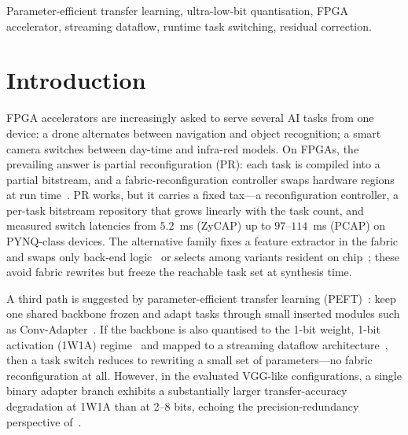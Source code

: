 \documentclass[journal]{IEEEtran}
\begin{document}
\begin{IEEEkeywords}
Parameter-efficient transfer learning, ultra-low-bit quantisation, FPGA accelerator, streaming dataflow, runtime task switching, residual correction.
\end{IEEEkeywords}

\section{Introduction}
 FPGA accelerators are increasingly asked to serve several AI tasks from one device: a drone alternates between navigation and object recognition; a smart camera switches between day-time and infra-red models. On FPGAs, the prevailing answer is partial reconfiguration (PR): each task is compiled into a partial bitstream, and a fabric-reconfiguration controller swaps hardware regions at run time~\cite{Huang2024ACNNE,Rangsikunpum2024CoarseToFine}. PR works, but it carries a fixed tax---a reconfiguration controller, a per-task bitstream repository that grows linearly with the task count, and measured switch latencies from $5.2$~ms (ZyCAP) up to $97$--$114$~ms (PCAP) on PYNQ-class devices. The alternative family fixes a feature extractor in the fabric and swaps only back-end logic~\cite{Whatmough2019FixyNN} or selects among variants resident on chip~\cite{ElBouazzaoui2025NeuroAdaptive}; these avoid fabric rewrites but freeze the reachable task set at synthesis time.

A third path is suggested by parameter-efficient transfer learning (PEFT)~\cite{Houlsby2019Adapters,Hu2022LoRA,Yu2024VisualTuning}: keep one shared backbone frozen and adapt tasks through small inserted modules such as Conv-Adapter~\cite{Chen2024ConvAdapter}. If the backbone is also quantised to the 1-bit weight, 1-bit activation (1W1A) regime~\cite{Rastegari2016XNOR,Hubara2016BinarizedNN,Qin2020BNNSurvey} and mapped to a streaming dataflow architecture~\cite{Umuroglu2017FINN,Blott2018FINNR}, then a task switch reduces to rewriting a small set of parameters---no fabric reconfiguration at all. However, in the evaluated VGG-like configurations, a single binary adapter branch exhibits a substantially larger transfer-accuracy degradation at 1W1A than at 2--8 bits, echoing the precision-redundancy perspective of~\cite{Jie2023PrecisionRedundancy}.
\end{document}
